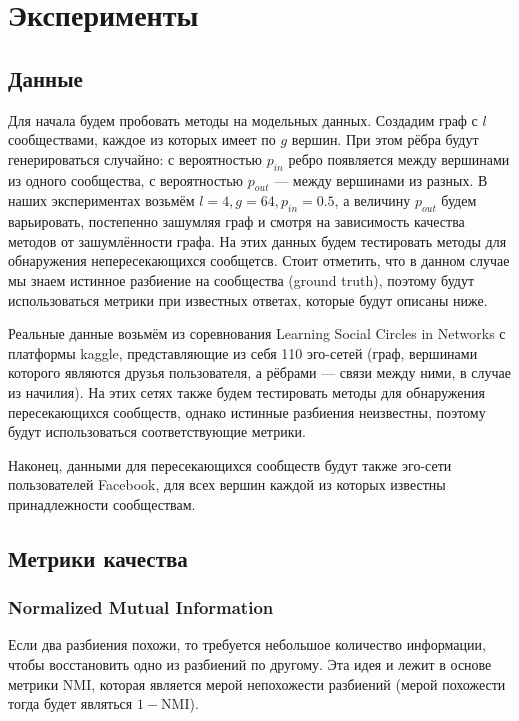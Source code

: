 \documentclass[12pt]{article}
\begin{document}
\section{Эксперименты}

\subsection{Данные}

Для начала будем пробовать методы на модельных данных. Создадим граф с $l$ сообществами, каждое из которых имеет по $g$ вершин. При этом рёбра будут генерироваться случайно: с вероятностью $p_{in}$ ребро появляется между вершинами из одного сообщества, с вероятностью $p_{out}$ --- между вершинами из разных. В наших экспериментах возьмём $l = 4, g = 64, p_{in} = 0.5$, а величину $p_{out}$ будем варьировать, постепенно зашумляя граф и смотря на зависимость качества методов от зашумлённости графа. На этих данных будем тестировать методы для обнаружения непересекающихся сообщетсв. Стоит отметить, что в данном случае мы знаем истинное разбиение на сообщества (ground truth), поэтому будут использоваться метрики при известных ответах, которые будут описаны ниже.

Реальные данные возьмём из соревнования Learning Social Circles in Networks \cite{kaggle} с платформы kaggle, представляющие из себя 110 эго-сетей (граф, вершинами которого являются друзья пользователя, а рёбрами --- связи между ними, в случае из начилия). На этих сетях также будем тестировать методы для обнаружения пересекающихся сообществ, однако истинные разбиения неизвестны, поэтому будут использоваться соответствующие метрики. 

Наконец, данными для пересекающихся сообществ будут также эго-сети пользователей Facebook, для всех вершин каждой из которых известны принадлежности сообществам.

\subsection{Метрики качества}

\subsubsection*{Normalized Mutual Information}

Если два разбиения похожи, то требуется небольшое количество информации, чтобы восстановить одно из разбиений по другому. Эта идея и лежит в основе метрики NMI, которая является мерой непохожести разбиений (мерой похожести тогда будет являться $1 -$NMI).
\end{document}
